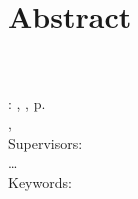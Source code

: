 \chapter*{Abstract}
\thispagestyle{empty}


\myName\\
\myTitle\\
\myLocation : \myUni , \myTime , \pageref{LastPage} p.\\
\myDegree , \mySubject\\
Supervisors: \mySupervisor\\

\noindent
\ldots \\

\noindent
Keywords: \myKeywords